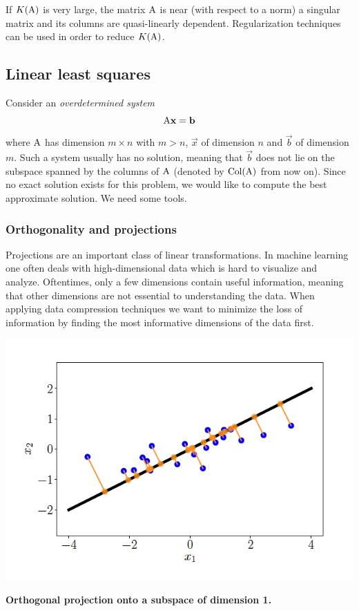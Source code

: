 If $K(\mathrm{A})$ is very large, the matrix $\mathrm{A}$ is near (with respect to a norm) a singular matrix and its columns are quasi-linearly dependent. Regularization techniques can be used in order to reduce $K(\mathrm{A})$.



\subsection{Linear least squares}

Consider an \textit{overdetermined system}
$$ \mathrm{A}\mathbf{x} = \mathbf{b} $$
where $\mathrm{A}$ has dimension $m \times n$ with $m > n$, $\vec{x}$ of dimension $n$ and $\vec{b}$ of dimension $m$. Such a system usually has no solution, meaning that $\vec{b}$ does not lie on the subspace spanned by the columns of $\mathrm{A}$ (denoted by $\text{Col}(\mathrm{A})$ from now on). Since no exact solution exists for this problem, we would like to compute the best approximate solution.
We need some tools.

\subsubsection{Orthogonality and projections}

Projections are an important class of linear transformations. In machine learning one often deals with high-dimensional data which is hard to visualize and analyze. Oftentimes, only a few dimensions contain useful information, meaning that other dimensions are not essential to understanding the data. When applying data compression techniques we want to minimize the loss of information by finding the most informative dimensions of the data first.

\includegraphics[width=0.7 \textwidth]{sections/images/orth1.png}

\textbf{Orthogonal projection onto a subspace of dimension 1.} 

